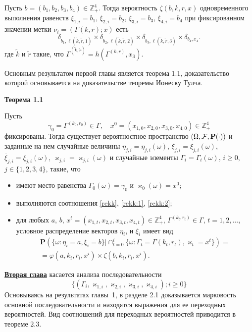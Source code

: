 \documentclass[14pt]{extarticle}
\theoremstyle{theorem}
\theoremstyle{remark}
\begin{document}
Пусть $b=(b_1, b_2, b_3, b_4) \in \mathbb{Z}_+^4$. 
Тогда вероятность $\zeta(b, k, r, x)$ одновременного выполнения равенств $\xi_{1,i}=b_1$, $\xi_{2,i}=b_2$, $\xi_{3,i}=b_3$, $\xi_{4,i}=b_4$ при фиксированном значении метки $\nu_i=(\Gamma{(k,r)}; x)$ есть
\begin{equation}
\delta_{b_1,\ell(\tilde{k},\tilde{r},1)} \times \delta_{b_2,\ell(\tilde{k},\tilde{r},2)} \times 
\delta_{b_3,\ell(\tilde{k},\tilde{r},3)} \times \delta_{b_4,x_4}.
\label{rekk:2}
\end{equation}
где $\tilde{k}$ и $\tilde{r}$ такие, что $\Gamma^{(\tilde{k},\tilde{r})}=h(\Gamma^{(k,r)},x_3)$.

Основным результатом первой главы является теорема 1.1, доказательство которой основывается на доказательстве теоремы Ионеску Тулча.

    {\bf Теорема 1.1} { 
    Пусть 
    $$\gamma_0=\Gamma^{(k_0,r_0)} \in \Gamma, \quad x^0=(x_{1,0},x_{2,0}, x_{3,0},x_{4,0})\in \mathbb{Z}_+^4$$ фиксированы. Тогда существует вероятностное пространство $(\Omega, {\cal F}, {\mathbf P}(\cdot))$ и заданные на нем случайные величины $\eta_{j,i}=\eta_{j,i}(\omega)$, $\xi_{j,i}=\xi_{j,i}(\omega)$, $\overline{\xi}_{j,i}=\xi_{j,i}(\omega)$, $\varkappa_{j,i}=\varkappa_{j,i}(\omega)$ и случайные элементы $\Gamma_i=\Gamma_i(\omega)$, $i\geqslant 0$, $j\in \{1, 2, 3, 4\}$, такие, что 
    \begin{itemize}
    \item имеют место равенства $\Gamma_0(\omega) = \gamma_0$ и $\varkappa_0(\omega)=x^0$;
    \item выполняются соотношения \eqref{rekk}, \eqref{rekk:1}, \eqref{rekk:2};
    \item для любых  $a$, $b$, $x^t=(x_{1,t},x_{2,t},x_{3,t},x_{4,t}) \in \mathbb{Z}_+^4$, $\Gamma^{(k_t,r_t)} \in \Gamma$, $t = 1, 2, \ldots$, условное распределение векторов $\eta_i$, и $\xi_i$ имеет вид 
\begin{multline*}
    {\mathbf P}(\{ \omega \colon \eta_i = a, \xi_i=b\} |\cap_{t=0}^{i}\{\omega\colon \Gamma_t=\Gamma{(k_t,r_t)}, \varkappa_t=x^t\})=\\
=\varphi(a,k_i,r_i,x^i)\times \zeta(b,k_i,r_i,x^i).
\end{multline*}
    \end{itemize}
}

\underline{\textbf{Вторая глава}} касается  анализа последовательности 
\begin{equation}
\{(\Gamma_i, \varkappa_{1,i}, \varkappa_{2,i}, \varkappa_{3,i}, \varkappa_{4,i}); i \geqslant 0\}
\label{all:sequence}
\end{equation}
Основываясь на результатах главы~1, в разделе 2.1 доказывается марковость основной последовательности и находятся выражения для ее переходных вероятностей. Вид соотношений для переходных вероятностей приводится в теореме 2.3.
\end{document}
